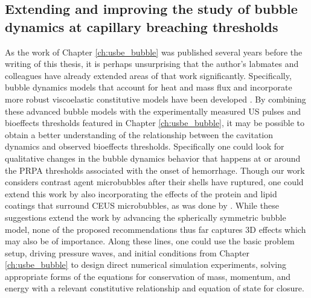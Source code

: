 \subsection{Extending and improving the study of bubble dynamics at
  capillary breaching thresholds}
As the work of Chapter \ref{ch:usbe_bubble} was published several
years before the writing of this thesis, it is perhaps unsurprising
that the author's labmates and colleagues have already extended areas
of that work significantly. Specifically, bubble dynamics models that
account for heat and mass flux and incorporate more robust
viscoelastic constitutive models have been developed
\citep{Gaudron2015,Warnez2015,Barajas2017}. By combining these
advanced bubble models with the experimentally measured \ac{US} pulses
and bioeffects thresholds featured in Chapter \ref{ch:usbe_bubble}, it
may be possible to obtain a better understanding of the relationship
between the cavitation dynamics and observed bioeffects
thresholds. Specifically one could look for qualitative changes in the
bubble dynamics behavior that happens at or around the \ac{PRPA}
thresholds associated with the onset of hemorrhage. Though our work
considers contrast agent microbubbles after their shells have
ruptured, one could extend this work by also incorporating the
effects of the protein and lipid coatings that surround \ac{CEUS}
microbubbles, as was done by \cite{Marmottant2005}. While these
suggestions extend the work by advancing the spherically symmetric
bubble model, none of the proposed recommendations thus far captures
3D effects which may also be of importance. Along these lines, one
could use the basic problem setup, driving pressure waves, and initial
conditions from Chapter \ref{ch:usbe_bubble} to design direct
numerical simulation experiments, solving appropriate forms of the
equations for conservation of mass, momentum, and energy with a
relevant constitutive relationship and equation of state for closure.

